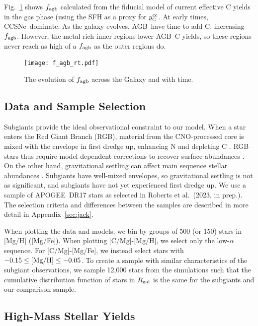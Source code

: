 \documentclass[fleqn,usenatbib]{mnras}
\newcommand{\citetjack}{Roberts et al.~(2023, in prep.)}
\newcommand{\agb}{AGB}
\newcommand{\apogee}{APOGEE}
\newcommand{\cc}{CCSNe}
\newcommand{\caah}{[C/Mg]-[Mg/H]}
\newcommand{\caafe}{[C/Mg]-[Mg/Fe]}
\newcommand{\Ycc}{\ensuremath{y_{\rm C}^{\rm cc}}}
\begin{document}
Fig.~\ref{fig:f_agb_evo} shows $f_{\rm agb}$ calculated from the fiducial model of current effective C yields in the gas phase (using the SFH as a proxy for $\Ycc$. 
At early times, \cc\ dominate. As the galaxy evolves, \agb\ have time to add C, increasing $f_{\rm agb}$. However, the metal-rich inner regions lower \agb\ C yields, so these regions never reach as high of a $f_{\rm agb}$ as the outer regions do. 

\begin{figure}
    \centering
    \texttt{[image: f\_agb\_rt.pdf]}
    \caption[]{The evolution of $f_{\rm agb}$ across the Galaxy and with time.}
    \label{fig:f_agb_evo}
\end{figure}



\subsection{Data and Sample Selection}

Subgiants provide the ideal observational constraint to our model. 
When a star enters the Red Giant Branch (RGB), material from the CNO-processed core is mixed with the envelope in first dredge up, enhancing N and depleting C \citep{iben67, vincenzo+21,KL14}. RGB stars thus require model-dependent corrections to recover surface abundances \citep[e.g.][]{vincenzo+21}. On the other hand, gravitational settling can affect main sequence stellar abundances \citep[e.g.][]{souto19}. Subgiants have well-mixed envelopes, so gravitational settling is not as significant, and subgiants have not yet experienced first dredge up. We use a sample of \apogee\ DR17 stars \citep{apogee17} as selected in \citetjack.  The selection criteria and differences between the samples are described in more detail in Appendix~\ref{sec:jack}.

When plotting the data and models, we bin by groups of 500 (or 150) stars in [Mg/H] ([Mg/Fe]). When plotting \caah, we select only the low-$\alpha$ sequence. For \caafe, we instead select stars with $-0.15 \leq {\rm [Mg/H]} \leq -0.05$.  
To create a sample with similar characteristics of the subgiant observations, we sample 12,000 stars from the simulations such that the cumulative distribution function of stars in $R_{\rm gal}$ is the same for the subgiants and our comparison sample. 



\subsection{High-Mass Stellar Yields}\label{sec:results_highmass}
\end{document}
